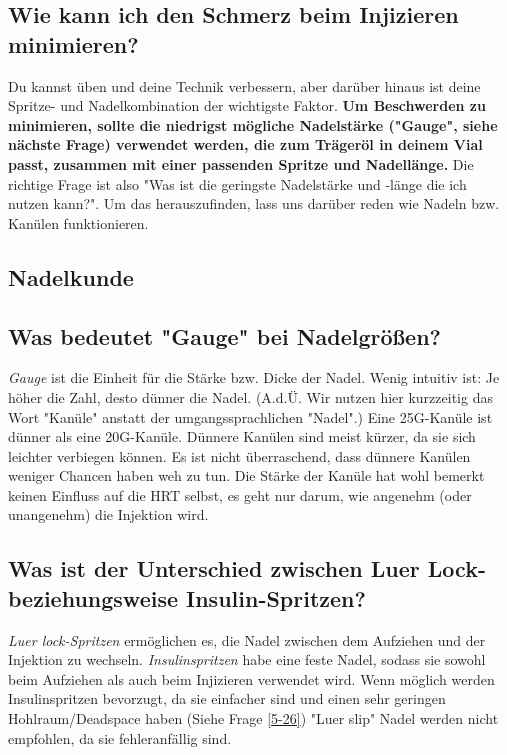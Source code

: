 \documentclass{article}
\begin{document}
\subsection{Wie kann ich den Schmerz beim Injizieren minimieren?}

Du kannst üben und deine Technik verbessern, aber darüber hinaus ist deine Spritze- und Nadelkombination der wichtigste Faktor. \textbf{Um Beschwerden zu minimieren, sollte die niedrigst mögliche Nadelstärke ("Gauge", siehe nächste Frage) verwendet werden, die zum Trägeröl in deinem Vial passt, zusammen mit einer passenden Spritze und Nadellänge. }Die richtige Frage ist also "Was ist die geringste Nadelstärke und -länge die ich nutzen kann?". Um das herauszufinden, lass uns darüber reden wie Nadeln bzw. Kanülen funktionieren.

\subsection*{Nadelkunde}

\subsection{Was bedeutet "Gauge" bei Nadelgrößen?}

\textit{Gauge }ist die Einheit für die Stärke bzw. Dicke der Nadel. Wenig intuitiv ist: Je höher die Zahl, desto dünner die Nadel. (A.d.Ü. Wir nutzen hier kurzzeitig das Wort "Kanüle" anstatt der umgangssprachlichen "Nadel".) Eine 25G-Kanüle ist dünner als eine 20G-Kanüle. Dünnere Kanülen sind meist kürzer, da sie sich leichter verbiegen können. Es ist nicht überraschend, dass dünnere Kanülen weniger Chancen haben weh zu tun. Die Stärke der Kanüle hat wohl bemerkt keinen Einfluss auf die HRT selbst, es geht nur darum, wie angenehm (oder unangenehm) die Injektion wird.

\subsection{Was ist der Unterschied zwischen Luer Lock- beziehungsweise Insulin-Spritzen?}\label{5-13}

\textit{Luer lock-Spritzen} ermöglichen es, die Nadel zwischen dem Aufziehen und der Injektion zu wechseln. \textit{Insulinspritzen} habe eine feste Nadel, sodass sie sowohl beim Aufziehen als auch beim Injizieren verwendet wird. Wenn möglich werden Insulinspritzen bevorzugt, da sie einfacher sind und einen sehr geringen Hohlraum/Deadspace haben (Siehe Frage \ref{5-26}) "Luer slip" Nadel werden nicht empfohlen, da sie fehleranfällig sind.
\end{document}
